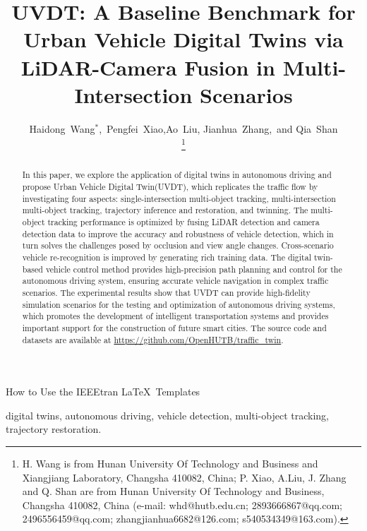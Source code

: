 \documentclass[lettersize,journal]{IEEEtran}
\begin{document}
\title{UVDT: A Baseline Benchmark for Urban Vehicle Digital Twins via LiDAR-Camera Fusion in Multi-Intersection Scenarios}
\author{Haidong~Wang\(^*\),~Pengfei~Xiao,Ao~Liu, Jianhua~Zhang,~and Qia~Shan

\thanks{H. Wang is from Hunan University Of Technology and Business and Xiangjiang Laboratory, Changsha 410082, China; P. Xiao, A.Liu, J. Zhang and Q. Shan are from Hunan University Of Technology and Business, Changsha 410082, China (e-mail: whd@hutb.edu.cn; 2893666867@qq.com; 2496556459@qq.com; zhangjianhua6682@126.com; s540534349@163.com).}}

%
{How to Use the IEEEtran \LaTeX \ Templates}

\maketitle

\begin{abstract}
In this paper, we explore the application of digital twins in autonomous driving and propose Urban Vehicle Digital Twin(UVDT), which replicates the traffic flow by investigating four aspects: single-intersection multi-object tracking, multi-intersection multi-object tracking, trajectory inference and restoration, and twinning. 
The multi-object tracking performance is optimized by fusing LiDAR detection and camera detection data to improve the accuracy and robustness of vehicle detection, which in turn solves the challenges posed by occlusion and view angle changes. 
Cross-scenario vehicle re-recognition is improved by generating rich training data. 
The digital twin-based vehicle control method provides high-precision path planning and control for the autonomous driving system, ensuring accurate vehicle navigation in complex traffic scenarios. 
The experimental results show that UVDT can provide high-fidelity simulation scenarios for the testing and optimization of autonomous driving systems, which promotes the development of intelligent transportation systems and provides important support for the construction of future smart cities.
The source code and datasets are available at \url{https://github.com/OpenHUTB/traffic_twin}.
\end{abstract}

\begin{IEEEkeywords}
digital twins, autonomous driving, vehicle detection, multi-object tracking, trajectory restoration.
\end{IEEEkeywords}
\end{document}
